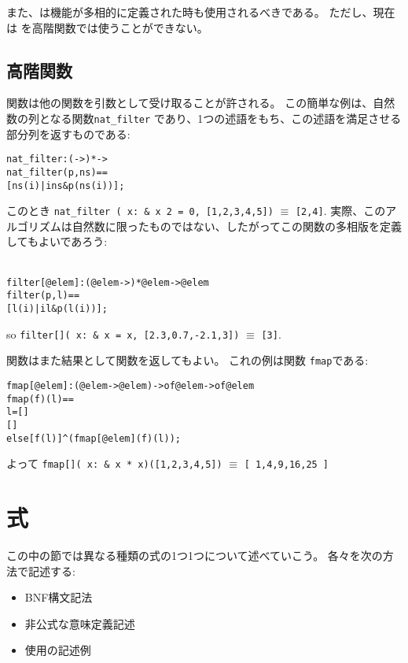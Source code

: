 \documentclass[\pformat,12pt]{jarticle}
\begin{document}
また、は機能が多相的に定義された時も使用されるべきである。
ただし、現在は  を高階関数では使うことができない。

\subsection{高階関数}

関数は他の関数を引数として受け取ることが許される。
この簡単な例は、自然数の列となる関数\texttt{nat\_filter} であり、1つの述語をもち、この述語を満足させる部分列を返すものである:
\begin{alltt}
  nat_filter : ( -> ) *  -> 
  nat_filter (p,ns) ==
    [ns(i) | i  ns & p(ns(i))];
\end{alltt}
このとき 
  \texttt{nat\_filter ( x: \& x  2 = 0, [1,2,3,4,5])} $\equiv$ \texttt{[2,4]}.
実際、このアルゴリズムは自然数に限ったものではない、したがってこの関数の多相版を定義してもよいであろう:
\begin{alltt}\label{filterdef}
  filter[@elem]: (@elem -> ) *  @elem ->  @elem
  filter (p,l) ==
    [l(i) | i  l & p(l(i))];
\end{alltt}
so \texttt{filter[]( x: \&
   x = x, [2.3,0.7,-2.1,3])} $\equiv$  \texttt{[3]}.

関数はまた結果として関数を返してもよい。
これの例は関数 \texttt{fmap}である:
\begin{alltt}
  fmap[@elem]: (@elem -> @elem) ->  of @elem ->  of @elem
  fmap (f)(l) ==
     l = []
     []
    else [f( l)]\verb+^+(fmap[@elem] (f)( l));
\end{alltt}
よって 
 \texttt{fmap[]( x: \& x * x)([1,2,3,4,5])} $\equiv$ 
\texttt{[ 1,4,9,16,25 ]}
\section{式}

この中の節では異なる種類の式の1つ1つについて述べていこう。
各々を次の方法で記述する:
\begin{itemize}
\item BNF構文記法
\item 非公式な意味定義記述
\item 使用の記述例
\end{itemize}
\end{document}
